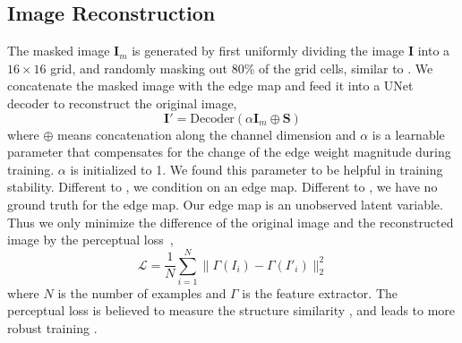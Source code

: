 \documentclass{article}
\newcommand{\mI}{\mathbf{I}}
\newcommand{\mS}{\mathbf{S}}
\newcommand{\cL}{\mathcal L}
\begin{document}
\subsection{Image Reconstruction}
The masked image $\mI_m$ is generated by first uniformly dividing the image $\mI$ into a $16\times 16$ grid, and randomly masking out 80\% of the grid cells, similar to \cite{he2021masked}. 
We concatenate the masked image with the edge map and feed it into a UNet decoder \cite{ronneberger2015u} to reconstruct the original image,
\begin{equation}
    \mI'=\text{Decoder}(\alpha\mI_m \oplus \mS)
    \label{eq:recon}
\end{equation}
where $\oplus$ means concatenation along the channel dimension and $\alpha$ is a learnable parameter that compensates for the change of the edge weight magnitude during training. $\alpha$ is initialized to 1. We found this parameter to be helpful in training stability.
Different to \cite{he2021masked}, we condition on an edge map.
Different to \cite{jakab2020self}, we have no ground truth for the edge map. Our edge map is an unobserved latent variable. Thus we only minimize the difference of the original image and the reconstructed image by the perceptual loss~\cite{johnson2016perceptual},
\begin{equation}
    \cL=\frac{1}{N}\sum_{i=1}^N\|\Gamma(I_i)-\Gamma(I'_i)\|^2_2
\end{equation}
where $N$ is the number of examples and $\Gamma$ is the feature extractor.
The perceptual loss is believed to measure the structure similarity \cite{johnson2016perceptual, gatys2016image, dosovitskiy2016generating}, and leads to more robust training \cite{jakab2018unsupervised, jakab2020self}.
\end{document}
